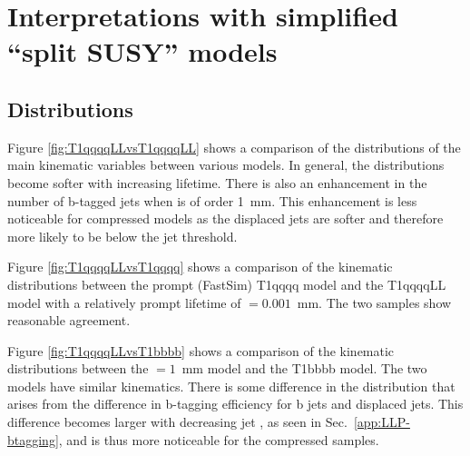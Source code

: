 \section{Interpretations with simplified ``split SUSY'' models}
\label{app:LLP}

\subsection{Distributions}
\label{app:LLP-distributions}

Figure \ref{fig:T1qqqqLLvsT1qqqqLL} shows a comparison of the distributions of 
the main kinematic variables between various \ctau models. In general, the
distributions become softer with increasing lifetime. %
There is also an enhancement in the number of b-tagged jets when \ctau
is of order 1~mm. This enhancement is less noticeable for compressed models
as the displaced jets are softer and therefore more likely to be below the jet 
\pt threshold.

Figure \ref{fig:T1qqqqLLvsT1qqqq} shows a comparison of the kinematic
distributions between the prompt (FastSim) T1qqqq model and the
T1qqqqLL model with a relatively prompt lifetime of \ctau$=0.001$~mm. 
The two samples show reasonable agreement.

Figure \ref{fig:T1qqqqLLvsT1bbbb} shows a comparison of the kinematic
distributions between the \ctau$=1$~mm model and the T1bbbb model. The two
models have similar kinematics. There is some difference in the \nb distribution
that arises from the difference in b-tagging efficiency for b jets and
displaced jets. This difference becomes larger with decreasing jet \pt, as
seen in Sec.~\ref{app:LLP-btagging}, and is thus more noticeable
for the compressed samples.

